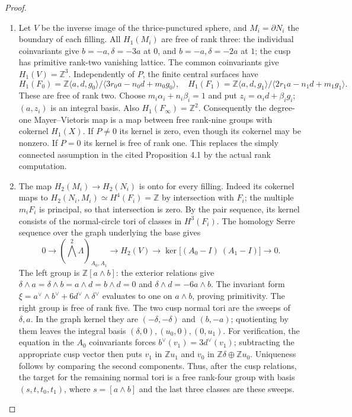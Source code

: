 \begin{proof}
\begin{enumerate}[label=\arabic*.,leftmargin=*]
\item Let $V$ be the inverse image of the thrice-punctured sphere, and
$M_i=\partial N_i$ the boundary of each filling. All $H_1(M_i)$
are free of rank three: the individual coinvariants give
$b=-a,\delta=-3a$ at $0$, and $b=-a,\delta=-2a$ at $1$;
the cusp has primitive rank-two vanishing lattice.
The common coinvariants give $H_1(V)=\mathbb Z^3$.
Independently of $P$, the finite central surfaces have
\[
 H_1(F_0)=\mathbb Z\langle a,d,g_0\rangle/
   \langle3r_0a-n_0d+m_0g_0\rangle,
\quad
 H_1(F_1)=\mathbb Z\langle a,d,g_1\rangle/
   \langle2r_1a-n_1d+m_1g_1\rangle.
\]
These are free of rank two. Choose
$m_i\alpha_i+n_i\beta_i=1$ and put
$z_i=\alpha_i d+\beta_i g_i$; $(a,z_i)$ is an integral basis.
Also $H_1(F_\infty)=\mathbb Z^2$.
Consequently the degree-one Mayer--Vietoris map is a map between
free rank-nine groups with cokernel $H_1(X)$.
If $P\ne0$ its kernel is zero, even though its cokernel may be
nonzero. If $P=0$ its kernel is free of rank one.
This replaces the simply connected assumption in the cited
Proposition 4.1 by the actual rank computation.

\item The map $H_2(M_i)\to H_2(N_i)$ is onto for every filling.
Indeed its cokernel maps to
$H_2(N_i,M_i)\simeq H^4(F_i)=\mathbb Z$ by intersection
with $F_i$; the multiple $m_iF_i$ is principal, so that
intersection is zero. By the pair sequence, its kernel consists
of the normal-circle tori of classes in $H^3(F_i)$.
The homology Serre sequence over the graph underlying the base gives
\[
 0\longrightarrow (\bigwedge^2\Lambda)_{A_0,A_1}
 \longrightarrow H_2(V)\longrightarrow
 \ker\bigl[(A_0-I)\ (A_1-I)\bigr]\longrightarrow0.
\]
The left group is $\mathbb Z[a\wedge b]$: the exterior relations
give $\delta\wedge a=\delta\wedge b=a\wedge d=b\wedge d=0$
and $\delta\wedge d=-6a\wedge b$.
The invariant form
$\xi=a^\vee\wedge b^\vee+6d^\vee\wedge\delta^\vee$
evaluates to one on $a\wedge b$, proving primitivity.
The right group is free of rank five.
The two cusp normal tori are the sweeps of $\delta,a$.
In the graph kernel they are
$(-\delta,-\delta)$ and $(b,-a)$; quotienting by them leaves
the integral basis $(\delta,0),(u_0,0),(0,u_1)$.
For verification, the equation in the $A_0$ coinvariants forces
$b^\vee(v_1)=3d^\vee(v_1)$; subtracting the appropriate cusp
vector then puts $v_1$ in $\mathbb Zu_1$ and $v_0$ in
$\mathbb Z\delta\oplus\mathbb Zu_0$. Uniqueness follows
by comparing the second components.
Thus, after the cusp relations, the target for the remaining
normal tori is a free rank-four group with basis $(s,t,t_0,t_1)$,
where $s=[a\wedge b]$ and the last three classes are these sweeps.


\end{enumerate}
\end{proof}
